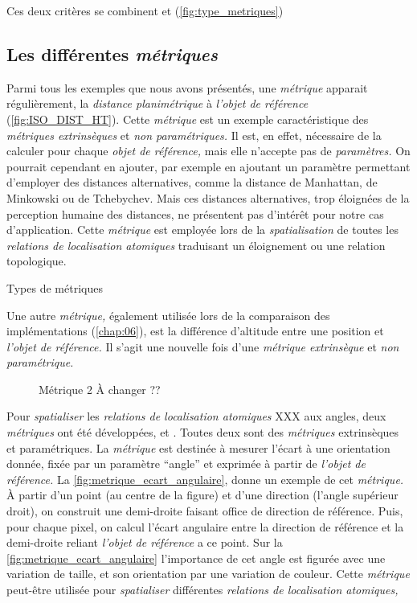 Ces deux critères se combinent et (\autoref{fig:type_metriques})

\subsection{Les différentes \emph{métriques}}

Parmi tous les exemples que nous avons présentés, une \emph{métrique}
apparait régulièrement, la \emph{distance planimétrique} à
\emph{l'objet de référence} (\autoref{fig:ISO_DIST_HT}). Cette
\emph{métrique} est un exemple caractéristique des \emph{métriques
  extrinsèques} et \emph{non paramétriques.} Il est, en effet,
nécessaire de la calculer pour chaque \emph{objet de référence,} mais
elle n'accepte pas de \emph{paramètres.}  On pourrait cependant en
ajouter, par exemple en ajoutant un paramètre permettant d'employer
des distances alternatives, comme la distance de Manhattan, de
Minkowski ou de Tchebychev. Mais ces distances alternatives, trop
éloignées de la perception humaine des distances, ne présentent pas
d’intérêt pour notre cas d'application. Cette \emph{métrique} est
employée lors de la \emph{spatialisation} de toutes les
\emph{relations de localisation atomiques} traduisant un éloignement
ou une relation topologique.

\begin{table}
  \centering
  
  \caption{Types de métriques}
  \label{fig:type_metriques}
\end{table}

Une autre \emph{métrique,} également utilisée lors de la comparaison
des implémentations (\autoref{chap:06}), est la différence d'altitude
entre une position et \emph{l'objet de référence.} Il s'agit une
nouvelle fois d'une \emph{métrique extrinsèque} et \emph{non
  paramétrique.} 

\begin{figure}
  \centering
  
  \caption{Métrique 2 À  changer ??}
\end{figure}

Pour \emph{spatialiser} les \emph{relations de localisation atomiques}
XXX aux angles, deux \emph{métriques} ont été développées,
 et . Toutes deux sont des
\emph{métriques} extrinsèques et paramétriques. La \emph{métrique}
 est destinée à mesurer l'écart à une
orientation donnée, fixée par un paramètre \enquote{angle} et exprimée
à partir de \emph{l'objet de référence.} La
\autoref{fig:metrique_ecart_angulaire}, donne un exemple de cet
\emph{métrique.} À partir d'un point (au centre de la figure) et d'une
direction (l'angle supérieur droit), on construit une demi-droite
faisant office de direction de référence. Puis, pour chaque pixel, on
calcul l'écart angulaire entre la direction de référence et la
demi-droite reliant \emph{l'objet de référence} a ce point. Sur la
\autoref{fig:metrique_ecart_angulaire} l'importance de cet angle est
figurée avec une variation de taille, et son orientation par une
variation de couleur. Cette \emph{métrique} peut-être utilisée pour
\emph{spatialiser} différentes \emph{relations de localisation atomiques,}

